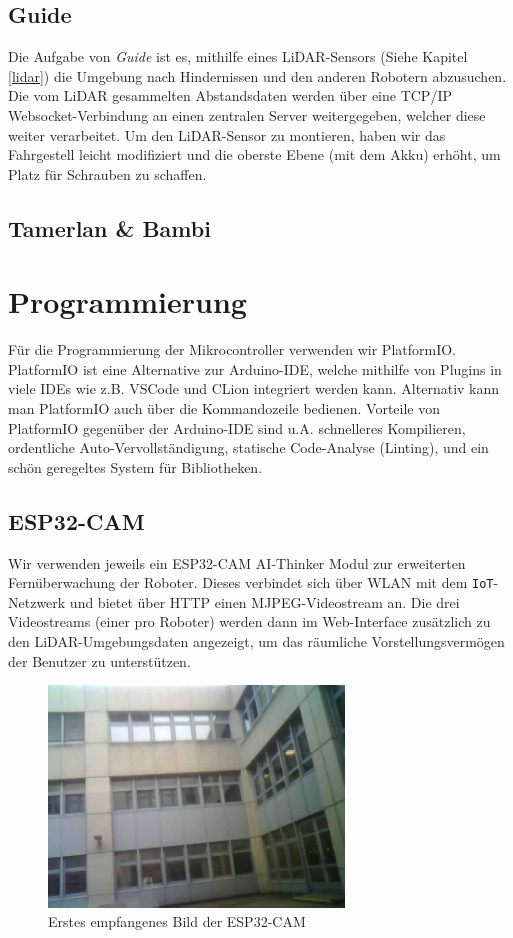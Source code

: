 \documentclass[12pt]{article}
\begin{document}
	\subsection{Guide}
	Die Aufgabe von \textit{Guide} ist es,
	mithilfe eines LiDAR-Sensors (Siehe Kapitel \ref{lidar}) die Umgebung nach Hindernissen
	und den anderen Robotern abzusuchen.
	Die vom LiDAR gesammelten Abstandsdaten werden über eine TCP/IP Websocket-Verbindung
	an einen zentralen Server weitergegeben,
	welcher diese weiter verarbeitet.
	Um den LiDAR-Sensor zu montieren,
	haben wir das Fahrgestell leicht modifiziert
	und die oberste Ebene (mit dem Akku) erhöht,
	um Platz für Schrauben zu schaffen.
	\subsection{Tamerlan \& Bambi}
	\section{Programmierung}
	Für die Programmierung der Mikrocontroller verwenden wir PlatformIO.
	PlatformIO ist eine Alternative zur Arduino-IDE,
	welche mithilfe von Plugins in viele IDEs wie z.B. VSCode und CLion integriert werden kann.
	Alternativ kann man PlatformIO auch über die Kommandozeile bedienen.
	Vorteile von PlatformIO gegenüber der Arduino-IDE sind u.A. schnelleres Kompilieren,
	ordentliche Auto-Vervollständigung,
	statische Code-Analyse (Linting),
	und ein schön geregeltes System für Bibliotheken.

	\subsection{ESP32-CAM}
	Wir verwenden jeweils ein ESP32-CAM AI-Thinker Modul zur erweiterten
	Fernüberwachung der Roboter.
	Dieses verbindet sich über WLAN mit dem \verb|IoT|-Netzwerk und bietet über HTTP einen MJPEG-Videostream an.
	Die drei Videostreams (einer pro Roboter) werden dann im Web-Interface
	zusätzlich zu den LiDAR-Umgebungsdaten angezeigt,
	um das räumliche Vorstellungsvermögen der Benutzer zu unterstützen.
	\begin{figure}[H]
		\includegraphics[width=0.7\textwidth, center]{img/cam_erstes_bild.png}
		\caption{Erstes empfangenes Bild der ESP32-CAM}
		\label{fig:cam_erstes_bild}
	\end{figure}
\end{document}
